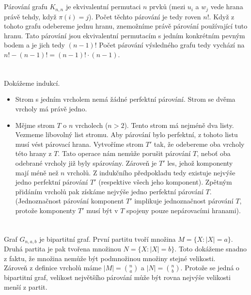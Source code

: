 \documentclass{scrartcl}
\begin{document}
    \section{}
        Párování grafu $K_{n,n}$ je ekvivalentní permutaci $n$ prvků (mezi $u_i$ a $w_j$ vede hrana právě tehdy, když $\pi(i) = j$). Počet těchto párování je tedy roven $n!$. Když z tohoto grafu odebereme jednu hranu, znemožníme právě párování používající tuto hranu. Tato párování jsou ekvivalentní permutacím s jedním konkrétním pevným bodem a je jich tedy $(n-1)!$ Počet párování výsledného grafu tedy vychází na $n! - (n-1)! = (n-1)! \cdot (n-1)$.
    
    \section{}
        Dokážeme indukcí. \\
        \begin{itemize}
            \item Strom s jedním vrcholem nemá žádné perfektní párování. Strom se dvěma vrcholy má právě jedno.
            \item Mějme strom $T$ o $n$ vrcholech ($n > 2$). Tento strom má nejméně dva listy. Vezmeme libovolný list stromu. Aby párování bylo perfektní, z tohoto listu musí vést párovací hrana. Vytvoříme strom $T'$ tak, že odebereme oba vrcholy této hrany z $T$. Tato operace nám nemůže porušit párování $T$, neboť oba odebrané vrcholy již byly spárovány. Zároveň je $T'$ les, jehož komponenty mají méně než $n$ vrcholů. Z indukčního předpokladu tedy existuje nejvýše jedno perfektní párování $T'$ (respektive všech jeho komponent). Zpětným přidáním vrcholů pak získáme nejvýše jedno perfektní párování $T$. (Jednoznačnost párování komponent $T'$ implikuje jednoznačnost párování $T$, protože komponenty $T'$ musí být v $T$ spojeny pouze nepárovacími hranami).
        \end{itemize}

    \section{}
        Graf $G_{n,a,b}$ je bipartitní graf. První partitu tvoří množina $M = \{ X :\vert X \vert = a\}$. Druhá partita je pak tvořena množinou $N = \{ X : \vert X \vert = b \}$. Toto dokážeme snadno z faktu, že množina nemůže být podmnožinou množiny stejné velikosti.\\

        Zároveň z definice vrcholů máme $\vert M \vert = \binom{n}{a}$ a $\vert N \vert = \binom{n}{b}$. Protože se jedná o bipartitní graf, velikost největšího párování může být rovna nejvýše velikosti menší z partit.\\
\end{document}
